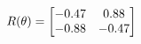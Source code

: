 \documentclass[preview]{standalone}
\begin{document}
\begin{align*}
\special{dvisvgm:raw <g id='unique000'>}R(\theta) = \begin{bmatrix}-0.47 & 0.88\\-0.88 & -0.47\end{bmatrix}\special{dvisvgm:raw </g>}
\end{align*}
\end{document}
